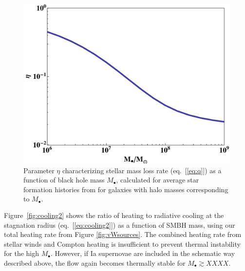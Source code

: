 \documentclass[usenatbib,fleqn]{mn2e}
\newcommand{\Mbh}[1][]{M_{\bullet#1}}
\begin{document}
\begin{figure}
\includegraphics[width=\columnwidth]{eta.pdf}
\caption{\label{fig:eta} Parameter  $\eta$ characterizing stellar mass loss rate (eq.~[\ref{eq:q}]) as a function of black hole mass $\Mbh$, calculated for average star formation histories from \citet{MosterNaab+:2013a} for galaxies with halo masses corresponding to $\Mbh$. }
\end{figure}

Figure~\ref{fig:cooling2} shows the ratio of heating to radiative cooling at the stagnation radius (eq.~[\ref{eq:cooling2}]) as a function of SMBH mass, using our total heating rate from Figure \ref{fig:vWsources}.  The combined heating rate from stellar winds and Compton heating is insufficient to prevent thermal instability for the high $\Mbh$.  However, if Ia supernovae are included in the schematic way described above, the flow again becomes thermally stable for $\Mbh \gtrsim XXXX$.


\end{document}
